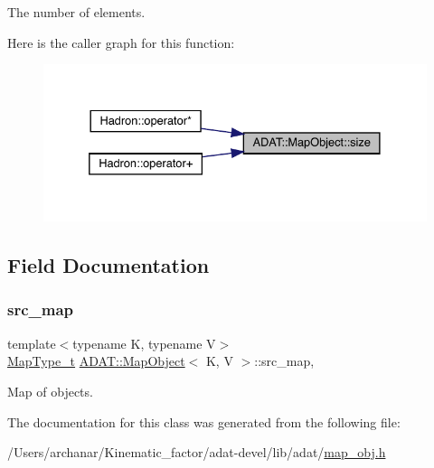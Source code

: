 The number of elements. 

Here is the caller graph for this function\+:
\nopagebreak
\begin{figure}[H]
\begin{center}
\leavevmode
\includegraphics[width=332pt]{da/d29/classADAT_1_1MapObject_ac0f5c3b258d234a7baf4f3d75e304af7_icgraph}
\end{center}
\end{figure}


\subsection{Field Documentation}
\mbox{\label{classADAT_1_1MapObject_af97a2c41e290158ccab37c2e52383194}} 
\subsubsection{\texorpdfstring{src\_map}{src\_map}}
{\footnotesize\ttfamily template$<$typename K, typename V$>$ \\
\mbox{\hyperlink{classADAT_1_1MapObject_ad6a4952087d3de5a43d08b2ea2ad270b}{Map\+Type\+\_\+t}} \mbox{\hyperlink{classADAT_1_1MapObject}{A\+D\+A\+T\+::\+Map\+Object}}$<$ K, V $>$\+::src\+\_\+map\hspace{0.3cm}{\ttfamily [mutable]}, {\ttfamily [protected]}}



Map of objects. 



The documentation for this class was generated from the following file\+:\begin{DoxyCompactItemize}
\item 
/\+Users/archanar/\+Kinematic\+\_\+factor/adat-\/devel/lib/adat/\mbox{\hyperlink{adat-devel_2lib_2adat_2map__obj_8h}{map\+\_\+obj.\+h}}\end{DoxyCompactItemize}
